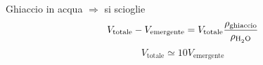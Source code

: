 \begin{Es}[Iceberg]
   Ghiaccio in acqua $\Longrightarrow$ si scioglie
   \[V_\text{totale}-V_\text{emergente}=V_\text{totale}\frac{\rho_\text{ghiaccio}}{\rho_\text{\ce{H2O}}}\]
   \[V_\text{totale}\simeq 10 V_\text{emergente}\]
\end{Es}
